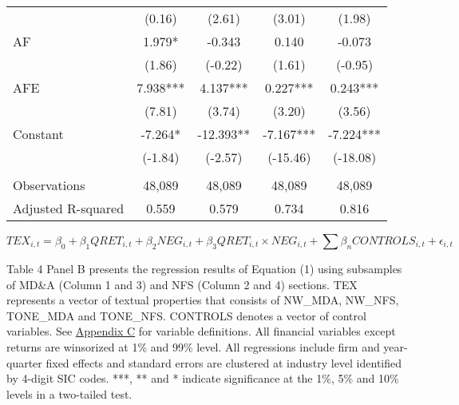 \begin{table}[H]
\begin{center}
\begin{tabular}{lcccc}
			& (0.16) & (2.61) & (3.01) & (1.98) \\
			AF & 1.979* & -0.343 & 0.140 & -0.073 \\
			& (1.86) & (-0.22) & (1.61) & (-0.95) \\
			AFE & 7.938*** & 4.137*** & 0.227*** & 0.243*** \\
			& (7.81) & (3.74) & (3.20) & (3.56) \\
			Constant & -7.264* & -12.393** & -7.167*** & -7.224*** \\
			& (-1.84) & (-2.57) & (-15.46) & (-18.08) \\
			&   &   &   &  \\
			Observations & 48,089 & 48,089 & 48,089 & 48,089 \\
			Adjusted R-squared & 0.559 & 0.579 & 0.734 & 0.816 \\
			\bottomrule
			\bottomrule
		\end{tabular}%
	\end{center}
\begin{footnotesize}
	\setcounter{equation}{0}
	\begin{equation}
		TEX_{i,t}=\beta_0+\beta_1QRET_{i,t}+\beta_2NEG_{i,t}+\beta_3QRET_{i,t}\times NEG_{i,t}+\sum\beta_nCONTROLS_{i,t}+\epsilon_{i,t}
	\end{equation}
	
	\noindent Table 4 Panel B presents the regression results of Equation (1) using subsamples of MD\&A (Column 1 and 3) and NFS (Column 2 and 4) sections. TEX represents a vector of textual properties that consists of NW\_MDA, NW\_NFS, TONE\_MDA and TONE\_NFS. CONTROLS denotes a vector of control variables. See \hyperref[appc]{Appendix C} for variable definitions. All financial variables except returns are winsorized at 1\% and 99\% level. All regressions include firm and year-quarter fixed effects and standard errors are clustered at industry level identified by 4-digit SIC codes. ***, ** and * indicate significance at the 1\%, 5\% and 10\% levels in a two-tailed test.
\end{footnotesize}
\end{table}%